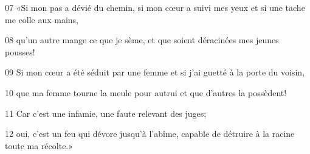 
07 «Si mon pas a dévié du chemin, si mon cœur a suivi mes yeux et si une tache me colle aux mains,

08 qu’un autre mange ce que je sème, et que soient déracinées mes jeunes pousses!

09 Si mon cœur a été séduit par une femme et si j’ai guetté à la porte du voisin,

10 que ma femme tourne la meule pour autrui et que d’autres la possèdent!

11 Car c’est une infamie, une faute relevant des juges;

12 oui, c’est un feu qui dévore jusqu’à l’abîme, capable de détruire à la racine toute ma récolte.»
